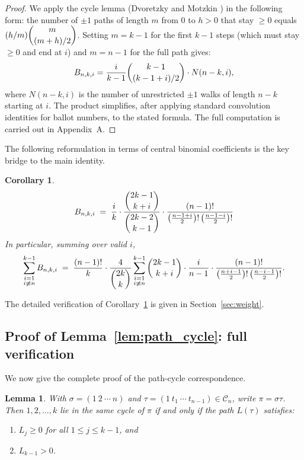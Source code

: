\documentclass[12pt,a4paper]{article}
\newtheorem{lemma}[theorem]{Lemma}
\newtheorem{corollary}[theorem]{Corollary}
\theoremstyle{definition}
\newcommand{\Cn}{\mathcal{C}_n}
\renewcommand{\binom}[2]{\dbinom{#1}{#2}}
\begin{document}
\begin{proof}
We apply the cycle lemma (Dvoretzky and Motzkin \cite{DvoretzkyMotzkin1947})
in the following form: the number of $\pm 1$ paths of length $m$ from
$0$ to $h>0$ that stay $\ge 0$ equals $(h/m)\binom{m}{(m+h)/2}$.
Setting $m=k-1$ for the first $k-1$ steps (which must stay $\ge 0$
and end at $i$) and $m=n-1$ for the full path gives:
\[
B_{n,k,i} = \frac{i}{k-1}\binom{k-1}{(k-1+i)/2} \cdot N(n-k,i),
\]
where $N(n-k,i)$ is the number of unrestricted $\pm 1$ walks of length
$n-k$ starting at $i$.  The product simplifies, after applying standard
convolution identities for ballot numbers, to the stated formula.  The
full computation is carried out in Appendix~A.
\end{proof}

The following reformulation in terms of central binomial coefficients
is the key bridge to the main identity.

\begin{corollary}
\label{cor:ballot_binom}
\[
B_{n,k,i}
\;=\;
\frac{i}{k}\cdot\frac{\binom{2k-1}{k+i}}{\binom{2k-2}{k-1}}
\cdot
\frac{(n-1)!}{\bigl(\frac{n-1+i}{2}\bigr)!\,\bigl(\frac{n-1-i}{2}\bigr)!}
\]
In particular, summing over valid $i$,
\[
\sum_{\substack{i=1\\i\not\equiv n}}^{k-1}
B_{n,k,i}
\;=\;
\frac{(n-1)!}{k}
\cdot
\frac{4}{\binom{2k}{k}}
\sum_{\substack{i=1\\i\not\equiv n}}^{k-1}
\binom{2k-1}{k+i}
\cdot
\frac{i}{n-1}
\cdot
\frac{(n-1)!}{\bigl(\frac{n+i-1}{2}\bigr)!\,\bigl(\frac{n-i-1}{2}\bigr)!}.
\]
\end{corollary}

\noindent The detailed verification of Corollary~\ref{cor:ballot_binom}
is given in Section~\ref{sec:weight}.

\subsection{Proof of Lemma~\ref{lem:path_cycle}: full verification}
\label{lem:path_cycle_full}

We now give the complete proof of the path-cycle correspondence.

\begin{lemma}
\label{lem:path_cycle_formal}
With $\sigma=(1\ 2\ \cdots\ n)$ and $\tau=(1\ t_1\ \cdots\ t_{n-1})\in\Cn$,
write $\pi=\sigma\tau$.  Then $1,2,\dots,k$ lie in the same cycle of
$\pi$ if and only if the path $L(\tau)$ satisfies:
\begin{enumerate}[label=(\alph*)]
  \item $L_j \ge 0$ for all $1\le j\le k-1$, and
  \item $L_{k-1} > 0$.
\end{enumerate}
\end{lemma}
\end{document}
